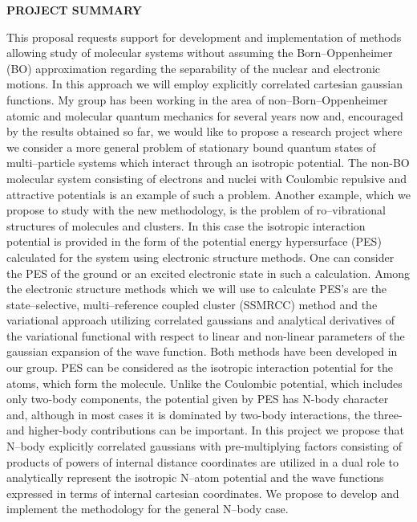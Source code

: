 
\noindent
{\bf PROJECT SUMMARY}

This proposal requests support for development and implementation
of methods allowing study of molecular systems without
assuming the Born--Oppenheimer (BO) approximation regarding the
separability of the nuclear and electronic motions. In this
approach we will employ explicitly  
correlated cartesian gaussian functions.
My group has been working in the area of non--Born--Oppenheimer
atomic and molecular quantum mechanics 
for several years now and, encouraged by the 
results obtained so far, we would like to propose a
research
project where we consider 
a more general problem of stationary bound
quantum states of multi--particle
systems which interact through an isotropic potential.
The non-BO molecular system consisting of electrons and nuclei 
with
Coulombic repulsive and attractive potentials 
is an example of such a problem.
Another example, which we propose to study with
the new methodology, is the problem of ro--vibrational structures
of molecules and clusters. 
In this case the isotropic interaction potential is provided
in the form of the potential energy hypersurface (PES)
calculated for the system using electronic structure methods.
One can consider the PES of the 
ground or an excited electronic state in such a calculation.
Among the electronic structure methods which we will
use to calculate PES's are
the state--selective, multi--reference coupled cluster (SSMRCC)
method and the variational approach utilizing correlated gaussians 
and analytical derivatives of the variational functional with
respect to linear and non-linear parameters of the gaussian
expansion of the wave function.
Both methods have been developed in our group.
PES can be considered as the
isotropic interaction potential
for the atoms, which form the molecule.
Unlike the Coulombic potential, which includes only two-body
components, the potential given by PES has N-body character and,
although in most cases it is dominated by two-body interactions,
the three- and higher-body contributions can be important.
In this project we propose that N--body
explicitly correlated gaussians with pre-multiplying factors consisting of
products of powers of internal distance coordinates are utilized in a dual
role to analytically represent the isotropic N--atom potential and the 
wave functions expressed in terms of internal cartesian coordinates. 
We propose to develop and implement the methodology for the general
N--body case. 


